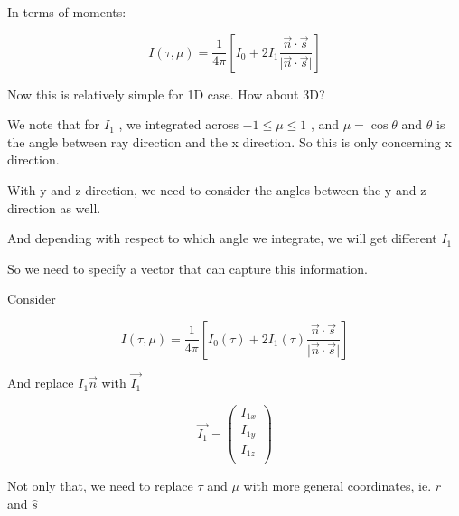 \documentclass[12pt]{article}
\renewcommand{\_}{\kern-1.5pt\textunderscore\kern-1.5pt}
\begin{document}
\begin{itemize}
In terms of moments:\par

 \[ I \left(  \tau, \mu  \right) =\frac{1}{4 \pi } \left[ I_{0}+2I_{1}\frac{\overrightarrow{n} \cdot \overrightarrow{s}}{ \vert \overrightarrow{n} \cdot \overrightarrow{s} \vert } \right]  \] \par


\vspace{\baselineskip}
Now this is relatively simple for 1D case. How about 3D?\par

We note that for  \( I_{1} \) , we integrated across  \( -1 \leq  \mu  \leq 1 \) , and  \(  \mu =\cos  \theta  \)  and  \(  \theta  \)  is the angle between ray direction and the x direction. So this is only concerning x direction.\par

With y and z direction, we need to consider the angles between the y and z direction as well.  \par

And depending with respect to which angle we integrate, we will get different  \( I_{1} \) \par

So we need to specify a vector that can capture this information.\par

Consider \par

 \[ I \left(  \tau, \mu  \right) =\frac{1}{4 \pi } \left[ I_{0} \left(  \tau \right) +2I_{1} \left(  \tau \right) \frac{\overrightarrow{n} \cdot \overrightarrow{s}}{ \vert \overrightarrow{n} \cdot \overrightarrow{s} \vert } \right]  \] \par

And replace  \( I_{1}\overrightarrow{n} \)  with  \( \overrightarrow{I_{1}} \) \par

 \[ \overrightarrow{I_{1}}= \left( \begin{array}{c}
	I_{1x}\\
	I_{1y}\\
	I_{1z}\\
	\end{array} \right)  \] \par

Not only that, we need to replace  \(  \tau \)  and  \(  \mu  \)  with more general coordinates, ie.  \( r \)  and  \( \hat{s} \) \par


\end{itemize}
\end{document}
